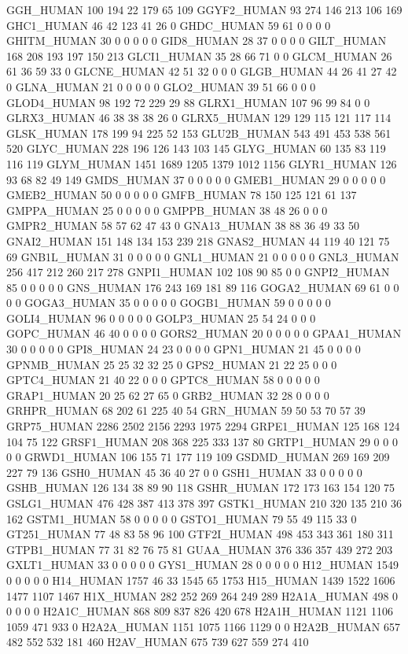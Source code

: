 GGH_HUMAN	100	194	22	179	65	109
GGYF2_HUMAN	93	274	146	213	106	169
GHC1_HUMAN	46	42	123	41	26	0
GHDC_HUMAN	59	61	0	0	0	0
GHITM_HUMAN	30	0	0	0	0	0
GID8_HUMAN	28	37	0	0	0	0
GILT_HUMAN	168	208	193	197	150	213
GLCI1_HUMAN	35	28	66	71	0	0
GLCM_HUMAN	26	61	36	59	33	0
GLCNE_HUMAN	42	51	32	0	0	0
GLGB_HUMAN	44	26	41	27	42	0
GLNA_HUMAN	21	0	0	0	0	0
GLO2_HUMAN	39	51	66	0	0	0
GLOD4_HUMAN	98	192	72	229	29	88
GLRX1_HUMAN	107	96	99	84	0	0
GLRX3_HUMAN	46	38	38	38	26	0
GLRX5_HUMAN	129	129	115	121	117	114
GLSK_HUMAN	178	199	94	225	52	153
GLU2B_HUMAN	543	491	453	538	561	520
GLYC_HUMAN	228	196	126	143	103	145
GLYG_HUMAN	60	135	83	119	116	119
GLYM_HUMAN	1451	1689	1205	1379	1012	1156
GLYR1_HUMAN	126	93	68	82	49	149
GMDS_HUMAN	37	0	0	0	0	0
GMEB1_HUMAN	29	0	0	0	0	0
GMEB2_HUMAN	50	0	0	0	0	0
GMFB_HUMAN	78	150	125	121	61	137
GMPPA_HUMAN	25	0	0	0	0	0
GMPPB_HUMAN	38	48	26	0	0	0
GMPR2_HUMAN	58	57	62	47	43	0
GNA13_HUMAN	38	88	36	49	33	50
GNAI2_HUMAN	151	148	134	153	239	218
GNAS2_HUMAN	44	119	40	121	75	69
GNB1L_HUMAN	31	0	0	0	0	0
GNL1_HUMAN	21	0	0	0	0	0
GNL3_HUMAN	256	417	212	260	217	278
GNPI1_HUMAN	102	108	90	85	0	0
GNPI2_HUMAN	85	0	0	0	0	0
GNS_HUMAN	176	243	169	181	89	116
GOGA2_HUMAN	69	61	0	0	0	0
GOGA3_HUMAN	35	0	0	0	0	0
GOGB1_HUMAN	59	0	0	0	0	0
GOLI4_HUMAN	96	0	0	0	0	0
GOLP3_HUMAN	25	54	24	0	0	0
GOPC_HUMAN	46	40	0	0	0	0
GORS2_HUMAN	20	0	0	0	0	0
GPAA1_HUMAN	30	0	0	0	0	0
GPI8_HUMAN	24	23	0	0	0	0
GPN1_HUMAN	21	45	0	0	0	0
GPNMB_HUMAN	25	25	32	32	25	0
GPS2_HUMAN	21	22	25	0	0	0
GPTC4_HUMAN	21	40	22	0	0	0
GPTC8_HUMAN	58	0	0	0	0	0
GRAP1_HUMAN	20	25	62	27	65	0
GRB2_HUMAN	32	28	0	0	0	0
GRHPR_HUMAN	68	202	61	225	40	54
GRN_HUMAN	59	50	53	70	57	39
GRP75_HUMAN	2286	2502	2156	2293	1975	2294
GRPE1_HUMAN	125	168	124	104	75	122
GRSF1_HUMAN	208	368	225	333	137	80
GRTP1_HUMAN	29	0	0	0	0	0
GRWD1_HUMAN	106	155	71	177	119	109
GSDMD_HUMAN	269	169	209	227	79	136
GSH0_HUMAN	45	36	40	27	0	0
GSH1_HUMAN	33	0	0	0	0	0
GSHB_HUMAN	126	134	38	89	90	118
GSHR_HUMAN	172	173	163	154	120	75
GSLG1_HUMAN	476	428	387	413	378	397
GSTK1_HUMAN	210	320	135	210	36	162
GSTM1_HUMAN	58	0	0	0	0	0
GSTO1_HUMAN	79	55	49	115	33	0
GT251_HUMAN	77	48	83	58	96	100
GTF2I_HUMAN	498	453	343	361	180	311
GTPB1_HUMAN	77	31	82	76	75	81
GUAA_HUMAN	376	336	357	439	272	203
GXLT1_HUMAN	33	0	0	0	0	0
GYS1_HUMAN	28	0	0	0	0	0
H12_HUMAN	1549	0	0	0	0	0
H14_HUMAN	1757	46	33	1545	65	1753
H15_HUMAN	1439	1522	1606	1477	1107	1467
H1X_HUMAN	282	252	269	264	249	289
H2A1A_HUMAN	498	0	0	0	0	0
H2A1C_HUMAN	868	809	837	826	420	678
H2A1H_HUMAN	1121	1106	1059	471	933	0
H2A2A_HUMAN	1151	1075	1166	1129	0	0
H2A2B_HUMAN	657	482	552	532	181	460
H2AV_HUMAN	675	739	627	559	274	410
